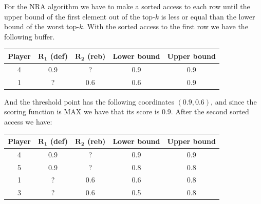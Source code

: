 \documentclass[12pt, a4paper]{report}
\begin{document}
\begin{enumerate}
            For the NRA algorithm we have to make a sorted access to each row until the upper bound of the first element out of the top-$k$ is less
            or equal than the lower bound of the worst top-$k$. With the sorted access to the first row we have the following buffer. 
            \begin{table}[H]
                \centering
                \begin{tabular}{c|cc|cc}
                \hline
                \textbf{Player} & \textbf{$\boldsymbol{R_1}$ (def)} & \textbf{$\boldsymbol{R_2}$ (reb)} & \textbf{Lower bound} & \textbf{Upper bound} \\ \hline
                4               & 0.9                               & ?                                 & 0.9                  & 0.9                  \\
                1               & ?                                 & 0.6                               & 0.6                  & 0.9                  \\ \hline
                \end{tabular}
            \end{table}
            And the threshold point has the following coordinates $(0.9,0.6)$, and since the scoring function is MAX we have that its score is $0.9$.
            After the second sorted access we have: 
            \begin{table}[H]
                \centering
                \begin{tabular}{c|cc|cc}
                \hline
                \textbf{Player} & \textbf{$\boldsymbol{R_1}$ (def)} & \textbf{$\boldsymbol{R_2}$ (reb)} & \textbf{Lower bound} & \textbf{Upper bound} \\ \hline
                4               & 0.9                               & ?                                 & 0.9                  & 0.9                  \\
                5               & 0.9                               & ?                                 & 0.8                  & 0.8                  \\
                1               & ?                                 & 0.6                               & 0.6                  & 0.8                  \\
                3               & ?                                 & 0.6                               & 0.5                  & 0.8                  \\ \hline
                \end{tabular}

\end{table}
\end{enumerate}
\end{document}
